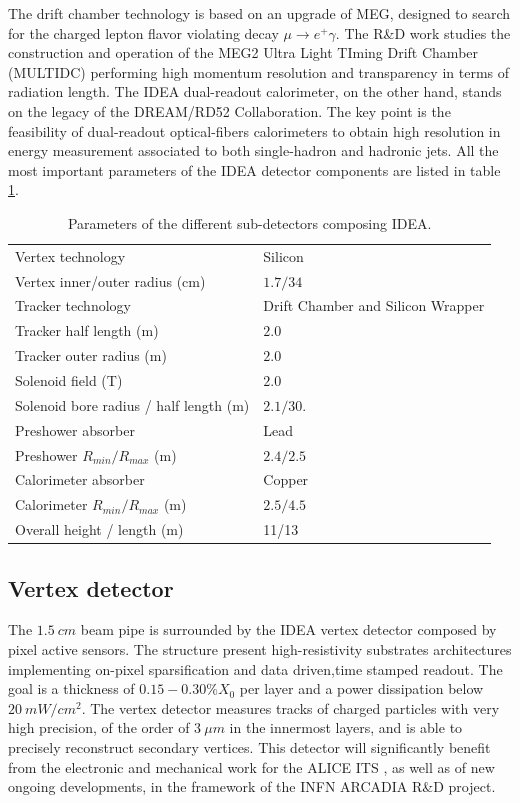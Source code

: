 The drift chamber technology is based on an upgrade of MEG, designed to search for the charged lepton flavor violating decay $\mu \rightarrow e^+\gamma$. The R\&D work studies the construction and operation of the MEG2 Ultra Light TIming Drift Chamber (MULTIDC) performing high momentum resolution and transparency in terms of radiation length.
The IDEA dual-readout calorimeter, on the other hand, stands on the legacy of the DREAM/RD52 Collaboration. The key point is the feasibility of dual-readout optical-fibers calorimeters to obtain high resolution in energy measurement associated to both single-hadron and hadronic jets.
All the most important parameters of the IDEA detector components are listed in table \ref{tab:IDEA_part}.\\
\begin{table}
  \centering
  \begin{tabular}{ll}
    \toprule
    Vertex technology                       & Silicon \\
    Vertex inner/outer radius (cm)          & $1.7/34$ \\
    \midrule
    Tracker technology                      & Drift Chamber and Silicon Wrapper\\
    Tracker half length (m)                 & $2.0$ \\
    Tracker outer radius (m)                & $2.0$ \\
    \midrule
    Solenoid field (T)                      & $2.0$ \\
    Solenoid bore radius / half length (m)  & $2.1/30.$ \\
    \midrule
    Preshower absorber                      & Lead \\
    Preshower $R_{min}/R_{max}$ (m)         & $2.4/2.5$ \\
    \midrule
    Calorimeter absorber                    & Copper \\
    Calorimeter $R_{min}/R_{max}$ (m)       & $2.5/4.5$ \\
    \midrule
    Overall height / length (m)             & 11/13 \\
    \bottomrule
  \end{tabular}
  \caption{Parameters of the different sub-detectors composing IDEA.}
  \label{tab:IDEA_part}
\end{table}

\subsection{Vertex detector}
The $1.5\ cm$ beam pipe is surrounded by the IDEA vertex detector composed by pixel active sensors. The structure present high-resistivity substrates architectures implementing on-pixel sparsification and data driven,time stamped readout.
The goal is a thickness of $0.15-0.30\% X_0$ per layer and a power dissipation below $20\ mW/cm^2$.
The vertex detector measures tracks of charged particles with very high precision, of the order of $3\ \mu m$ in the innermost layers, and is able to precisely reconstruct secondary vertices.
This detector will significantly benefit from the electronic and mechanical work for the ALICE ITS \cite{alice_its}, as well as of new ongoing developments, in the framework of the INFN ARCADIA R\&D project.

